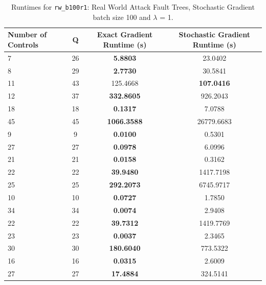 \documentclass{article}
\begin{document}
\begin{table}[h]
\centering
\begin{tabular}{lccc}
\toprule
Number of Controls & Q & Exact Gradient Runtime (s) & Stochastic Gradient Runtime (s) \\
\midrule
7 & 26 & \textbf{5.8803} & 23.0402 \\
8 & 29 & \textbf{2.7730} & 30.5841 \\
11 & 43 & 125.4668 & \textbf{107.0416} \\
12 & 37 & \textbf{332.8605} & 926.2043 \\
18 & 18 & \textbf{0.1317} & 7.0788 \\
45 & 45 & \textbf{1066.3588} & 26779.6683 \\
9 & 9 & \textbf{0.0100} & 0.5301 \\
27 & 27 & \textbf{0.0978} & 6.0996 \\
21 & 21 & \textbf{0.0158} & 0.3162 \\
22 & 22 & \textbf{39.9480} & 1417.7198 \\
25 & 25 & \textbf{292.2073} & 6745.9717 \\
10 & 10 & \textbf{0.0727} & 1.7850 \\
34 & 34 & \textbf{0.0074} & 2.9408 \\
22 & 22 & \textbf{39.7312} & 1419.7769 \\
23 & 23 & \textbf{0.0037} & 2.3465 \\
30 & 30 & \textbf{180.6040} & 773.5322 \\
16 & 16 & \textbf{0.0315} & 2.6009 \\
27 & 27 & \textbf{17.4884} & 324.5141 \\
\bottomrule
\end{tabular}
\caption{Runtimes for \texttt{rw\_b100r1}: Real World Attack Fault Trees, Stochastic Gradient batch size 100 and $\lambda$ = 1.}
\end{table}
\end{document}
